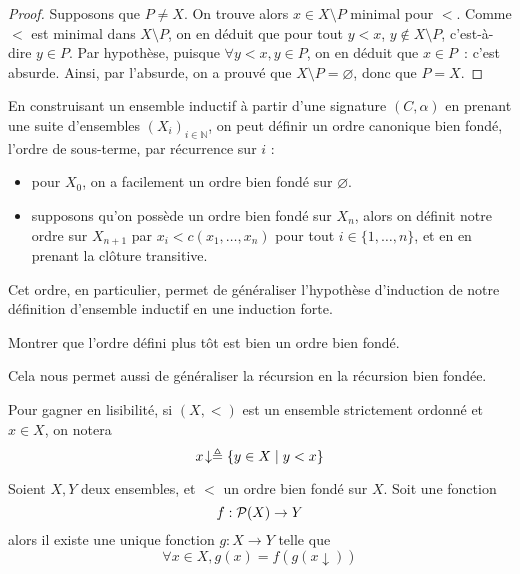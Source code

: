 \begin{proof}
  Supposons que $P\neq X$. On trouve alors $x\in X \setminus P$ minimal pour
  $<$. Comme $<$ est minimal dans $X\setminus P$, on en déduit que pour tout
  $y < x$, $y \notin X\setminus P$, c'est-à-dire $y\in P$. Par hypothèse,
  puisque $\forall y < x, y\in P$, on en déduit que $x\in P$~: c'est absurde.
  Ainsi, par l'absurde, on a prouvé que $X\setminus P = \varnothing$, donc que
  $P = X$.
\end{proof}

\begin{remark}
  En construisant un ensemble inductif à partir d'une signature $(C,\alpha)$ en
  prenant une suite d'ensembles $(X_i)_{i\in \mathbb N}$, on peut définir un ordre
  canonique bien fondé, l'ordre de sous-terme, par récurrence sur $i$ :
  \begin{itemize}
  \item pour $X_0$, on a facilement un ordre bien fondé sur $\varnothing$.
  \item supposons qu'on possède un ordre bien fondé sur $X_n$, alors on définit
    notre ordre sur $X_{n+1}$ par $x_i < c(x_1,\ldots,x_n)$ pour tout
    $i \in \{1,\ldots,n\}$, et en en prenant la clôture transitive.
  \end{itemize}

  Cet ordre, en particulier, permet de généraliser l'hypothèse d'induction de
  notre définition d'ensemble inductif en une induction forte.
\end{remark}

\begin{exercise}
  Montrer que l'ordre défini plus tôt est bien un ordre bien fondé.
\end{exercise}

Cela nous permet aussi de généraliser la récursion en la récursion bien fondée.

\begin{notation}
  Pour gagner en lisibilité, si $(X,<)$ est un ensemble strictement ordonné et
  $x \in X$, on notera
  \[x\!\downarrow \triangleq \{y \in X \mid y < x\}\]
\end{notation}

\begin{theorem}\label{thm.recur.bf}
  Soient $X,Y$ deux ensembles, et $<$ un ordre bien fondé sur $X$. Soit
  une fonction
  \[f : \mathcal{P} (X) \to Y\]
  alors il existe une unique fonction $g : X \to Y$ telle que
  \[\forall x \in X, g(x) = f(g(x\!\downarrow))\]
\end{theorem}

